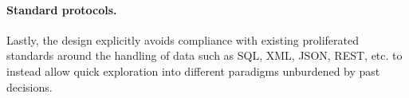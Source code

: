 \paragraph{Standard protocols.}
Lastly, the design explicitly avoids compliance with existing proliferated standards around the handling of data such as SQL, \gls{XML}, \gls{JSON}, \gls{REST}, etc. to instead allow quick exploration into different paradigms unburdened by past decisions.
